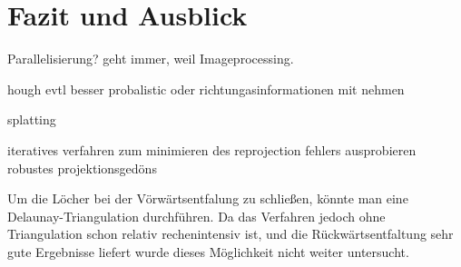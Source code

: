 \chapter{Fazit und Ausblick}
\label{ch:summary}
Parallelisierung?
geht immer, weil Imageprocessing.

hough evtl besser probalistic oder richtungasinformationen mit nehmen

splatting

iteratives verfahren zum minimieren des reprojection fehlers ausprobieren
robustes projektionsgedöns

Um die Löcher bei der Vörwärtsentfalung zu schließen, könnte man eine Delaunay-Triangulation durchführen. 
Da das Verfahren jedoch ohne Triangulation schon relativ rechenintensiv ist, und die Rückwärtsentfaltung sehr gute Ergebnisse liefert wurde dieses Möglichkeit nicht weiter untersucht.
